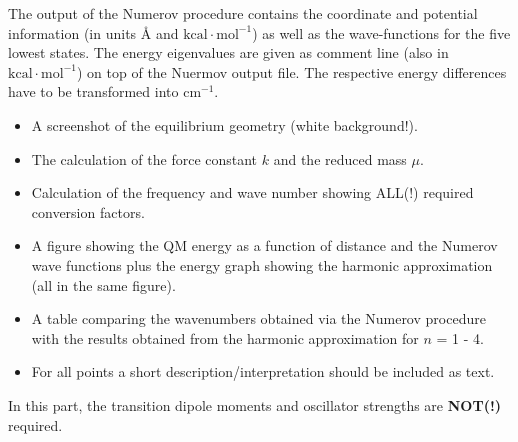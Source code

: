 \documentclass[
  letterpaper,
]{article}
\providecommand{\tightlist}{%
  \setlength{\itemsep}{0pt}\setlength{\parskip}{0pt}}\usepackage{longtable,booktabs,array}
\begin{document}
The output of the Numerov procedure contains the coordinate and
potential information (in units Å and \(\mathrm{kcal\cdot mol^{-1}}\))
as well as the wave-functions for the five lowest states. The energy
eigenvalues are given as comment line (also in
\(\mathrm{kcal\cdot mol^{-1}}\)) on top of the Nuermov output file. The
respective energy differences have to be transformed into
\(\mathrm{cm^{-1}}\).

\begin{tcolorbox}[enhanced jigsaw, toptitle=1mm, opacitybacktitle=0.6, colframe=quarto-callout-important-color-frame, toprule=.15mm, breakable, bottomrule=.15mm, left=2mm, title={The report for this part should include:}, titlerule=0mm, leftrule=.75mm, bottomtitle=1mm, coltitle=black, arc=.35mm, rightrule=.15mm, opacityback=0, colback=white, colbacktitle=quarto-callout-important-color!10!white]

\begin{itemize}
\tightlist
\item
  A screenshot of the equilibrium geometry (white background!).
\item
  The calculation of the force constant \(k\) and the reduced mass
  \(\mu\).
\item
  Calculation of the frequency and wave number showing ALL(!) required
  conversion factors.
\item
  A figure showing the QM energy as a function of distance and the
  Numerov wave functions plus the energy graph showing the harmonic
  approximation (all in the same figure).
\item
  A table comparing the wavenumbers obtained via the Numerov procedure
  with the results obtained from the harmonic approximation for \(n\) =
  1 - 4.
\item
  For all points a short description/interpretation should be included
  as text.
\end{itemize}

\end{tcolorbox}

\begin{tcolorbox}[enhanced jigsaw, toptitle=1mm, opacitybacktitle=0.6, colframe=quarto-callout-note-color-frame, toprule=.15mm, breakable, bottomrule=.15mm, left=2mm, title=\textcolor{quarto-callout-note-color}{\faInfo}\hspace{0.5em}{Note}, titlerule=0mm, leftrule=.75mm, bottomtitle=1mm, coltitle=black, arc=.35mm, rightrule=.15mm, opacityback=0, colback=white, colbacktitle=quarto-callout-note-color!10!white]

In this part, the transition dipole moments and oscillator strengths are
\textbf{NOT(!)} required.

\end{tcolorbox}
\end{document}
